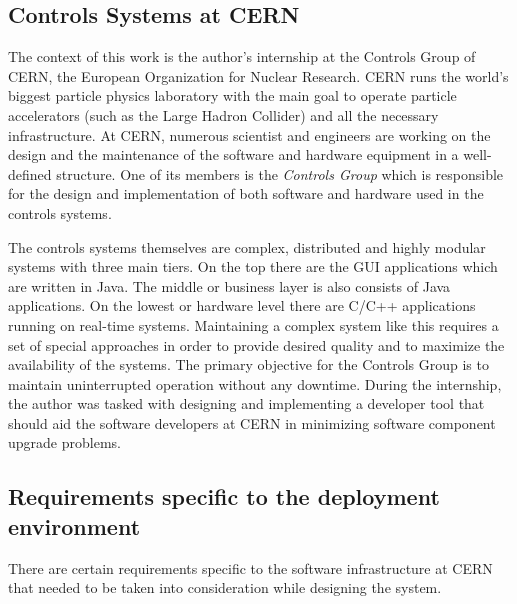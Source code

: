 \subsection{Controls Systems at CERN}
The context of this work is the author's internship at the Controls Group of
CERN, the European Organization for Nuclear Research. CERN runs the world's
biggest particle physics laboratory with the main goal to operate particle
accelerators (such as the Large Hadron Collider) and all the necessary
infrastructure. At CERN, numerous scientist and engineers are working on the
design and the maintenance of the software and hardware equipment in a
well-defined structure. One of its members is the \emph{Controls Group} which is
responsible for the design and implementation of both software and hardware used
in the controls systems.

The controls systems themselves are complex, distributed and highly modular
systems with three main tiers. On the top there are the GUI applications which
are written in Java. The middle or business layer is also consists of Java
applications. On the lowest or hardware level there are C/C++ applications
running on real-time systems. Maintaining a complex system like this requires a
set of special approaches in order to provide desired quality and to maximize
the availability of the systems. The primary objective for the Controls Group is
to maintain uninterrupted operation without any downtime. During the internship,
the author was tasked with designing and implementing a developer tool that
should aid the software developers at CERN in minimizing software component
upgrade problems.

\subsection{Requirements specific to the deployment environment}
There are certain requirements specific to the software infrastructure at CERN
that needed to be taken into consideration while designing the system.

